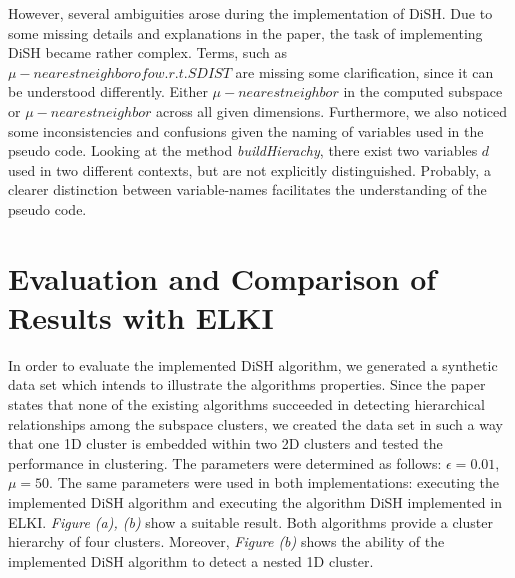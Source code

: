 \documentclass{article}
\begin{document}

However, several ambiguities arose during the implementation of DiSH. Due to some missing details and explanations in the paper, the task of implementing DiSH became rather complex. Terms, such as $\mu - nearest neighbor of o w.r.t. SDIST$ are missing some clarification, since it can be understood differently. Either $\mu -nearest neighbor$ in the computed subspace or $\mu -nearest neighbor$ across all given dimensions. Furthermore, we also noticed some inconsistencies and confusions given the naming of variables used in the pseudo code. Looking at the method \emph{buildHierachy}, there exist two variables $d$ used in two different contexts, but are not explicitly distinguished. Probably, a clearer distinction between variable-names facilitates the understanding of the pseudo code.    

\section{Evaluation and Comparison of Results with ELKI}

In order to evaluate the implemented DiSH algorithm, we generated a synthetic data set which intends to illustrate the algorithms properties. Since the paper states that none of the existing algorithms succeeded in detecting hierarchical relationships among the subspace clusters, we created the data set in such a way that one 1D cluster is embedded within two 2D clusters and tested the performance in clustering. The parameters were determined as follows: $\epsilon = 0.01$, $\mu = 50$. The same parameters were used in both implementations: executing the implemented DiSH algorithm and executing the algorithm DiSH implemented in ELKI. \emph{Figure (a), (b)} show a suitable result. Both algorithms provide a cluster hierarchy of four clusters. Moreover, \emph{Figure (b)} shows the ability of the implemented DiSH algorithm to detect a nested 1D cluster. 
\end{document}
